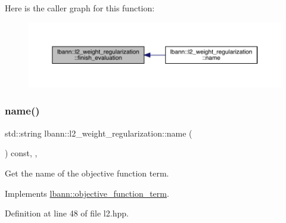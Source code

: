 Here is the caller graph for this function\+:\nopagebreak
\begin{figure}[H]
\begin{center}
\leavevmode
\includegraphics[width=350pt]{classlbann_1_1l2__weight__regularization_a5517e1fa9da8a28f39cf208054f6138a_icgraph}
\end{center}
\end{figure}
\mbox{\label{classlbann_1_1l2__weight__regularization_acf602d51617f6730343948b72ace8dfe}} 
\subsubsection{\texorpdfstring{name()}{name()}}
{\footnotesize\ttfamily std\+::string lbann\+::l2\+\_\+weight\+\_\+regularization\+::name (\begin{DoxyParamCaption}{ }\end{DoxyParamCaption}) const\hspace{0.3cm}{\ttfamily [inline]}, {\ttfamily [override]}, {\ttfamily [virtual]}}

Get the name of the objective function term. 

Implements \hyperlink{classlbann_1_1objective__function__term_a964fbfad3dd0434aa8f32c5fedf1079a}{lbann\+::objective\+\_\+function\+\_\+term}.



Definition at line 48 of file l2.\+hpp.


